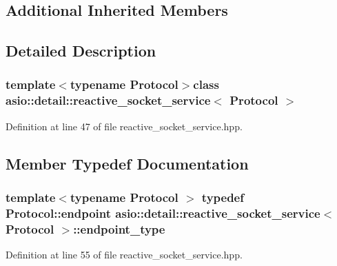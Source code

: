 \subsection*{Additional Inherited Members}


\subsection{Detailed Description}
\subsubsection*{template$<$typename Protocol$>$class asio\+::detail\+::reactive\+\_\+socket\+\_\+service$<$ Protocol $>$}



Definition at line 47 of file reactive\+\_\+socket\+\_\+service.\+hpp.



\subsection{Member Typedef Documentation}
\hypertarget{classasio_1_1detail_1_1reactive__socket__service_adad302be53c8a4ea6e7693bc88595381}{}
\subsubsection[{endpoint\+\_\+type}]{\setlength{\rightskip}{0pt plus 5cm}template$<$typename Protocol $>$ typedef Protocol\+::endpoint {\bf asio\+::detail\+::reactive\+\_\+socket\+\_\+service}$<$ Protocol $>$\+::{\bf endpoint\+\_\+type}}\label{classasio_1_1detail_1_1reactive__socket__service_adad302be53c8a4ea6e7693bc88595381}


Definition at line 55 of file reactive\+\_\+socket\+\_\+service.\+hpp.

\hypertarget{classasio_1_1detail_1_1reactive__socket__service_a2fc869359f3eb7b6f25925f10e594e1d}{}
